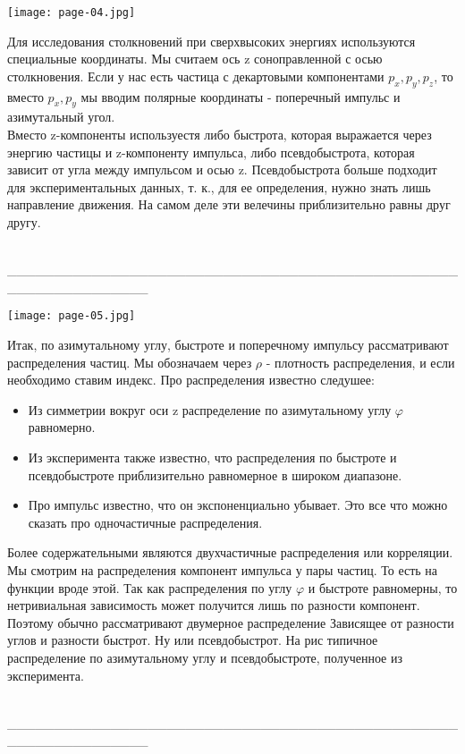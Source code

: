 \documentclass[12pt]{article}
\renewcommand{\phi}{\varphi}
\renewcommand{\line}{\\ \_\_\_\_\_\_\_\_\_\_\_\_\_\_\_\_\_\_\_\_\_\_\_\_\_\_\_\_\_\_\_\_\_\_\_\_\_\_\_\_\_\_\_\_\_\_\_\_\_\_\_\_\_\_\_\_\_\_\_\_\_\_\_ \\ }
\begin{document}
\begin{minipage}[h]{0.29\linewidth}
	\texttt{[image: page-04.jpg]}
\end{minipage}
\begin{minipage}[h]{0.7\linewidth}
	Для исследования столкновений при сверхвысоких энергиях используются специальные координаты. Мы считаем ось z соноправленной с осью столкновения. Если у нас есть частица с декартовыми компонентами $p_x, p_y, p_z$, то вместо $p_x, p_y$ мы вводим полярные координаты - поперечный импульс и азимутальный угол. \\
	\qquad Вместо z-компоненты используестя либо быстрота, которая выражается через энергию частицы и z-компоненту импульса, либо псевдобыстрота, которая зависит от угла между импульсом и осью z. Псевдобыстрота больше подходит для экспериментальных данных, т. к., для ее определения, нужно знать лишь направление движения. На самом деле эти велечины приблизительно равны друг другу.
\end{minipage}
\line

\begin{minipage}[h]{0.29\linewidth}
	\texttt{[image: page-05.jpg]}
\end{minipage}
\begin{minipage}[h]{0.7\linewidth}
	Итак, по азимутальному углу, быстроте и поперечному импульсу рассматривают распределения частиц. Мы обозначаем через $\rho$ - плотность распределения, и если необходимо ставим индекс. Про распределения известно следушее:
	\begin{itemize}
		\item Из симметрии вокруг оси z распределение по азимутальному углу $\phi$ равномерно.
		\item Из эксперимента также известно, что распределения по быстроте и псевдобыстроте приблизительно равномерное в широком диапазоне.
		\item Про импульс известно, что он экспоненциально убывает.
		Это все что можно сказать про одночастичные распределения.
	\end{itemize}
	\qquad Более содержательными являются двухчастичные распределения или корреляции. Мы смотрим на распределения компонент импульса у пары частиц. То есть на функции вроде этой. Так как распределения по углу $\phi$ и быстроте равномерны, то нетривиальная зависимость может получится лишь по разности компонент. Поэтому обычно рассматривают двумерное распределение Зависящее от разности углов и разности быстрот. Ну или псевдобыстрот. На рис типичное распределение по азимутальному углу и псевдобыстроте, полученное из эксперимента.
\end{minipage}
\line
\end{document}
